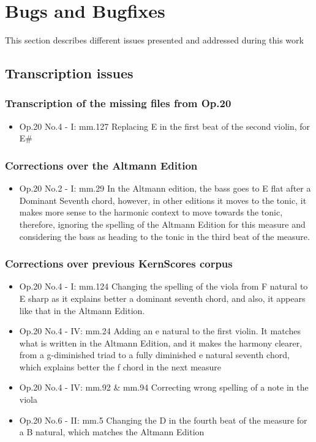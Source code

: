 \appendix
\chapter{Bugs and Bugfixes} %
This section describes different issues presented and addressed during this work
	\section{Transcription issues}
		\subsection{Transcription of the missing files from Op.20}
    \begin{itemize}
    \item Op.20 No.4 - I: mm.127
		Replacing E in the first beat of the second violin, for E\#
    \end{itemize}
    \subsection{Corrections over the Altmann Edition}
    \begin{itemize}
    \item Op.20 No.2 - I: mm.29
    In the Altmann edition, the bass goes to E flat after a Dominant Seventh chord, however, in other editions it moves to the tonic, it makes more sense to the harmonic context to move towards the tonic, therefore, ignoring the spelling of the Altmann Edition for this measure and considering the bass as heading to the tonic in the third beat of the measure.
    \end{itemize}
		\subsection{Corrections over previous KernScores corpus}
    \begin{itemize}
    \item Op.20 No.4 - I: mm.124
    Changing the spelling of the viola from F natural to E sharp as it explains better a dominant seventh chord, and also, it appears like that in the Altmann Edition.

    \item Op.20 No.4 - IV: mm.24
    Adding an e natural to the first violin. It matches what is written in the Altmann Edition, and it makes the harmony clearer, from a g-diminished triad to a fully diminished e natural seventh chord, which explains better the f chord in the next measure

    \item Op.20 No.4 - IV: mm.92 \& mm.94
    Correcting wrong spelling of a note in the viola

    \item Op.20 No.6 - II: mm.5
    Changing the D in the fourth beat of the measure for a B natural, which matches the Altmann Edition
    \end{itemize}
